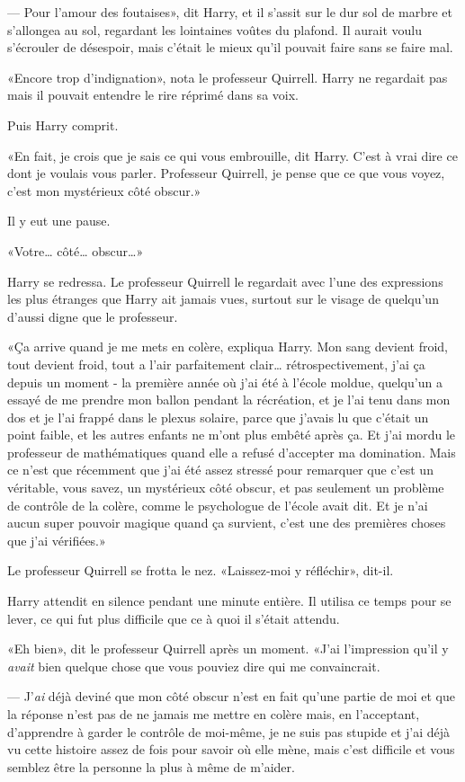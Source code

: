 --- Pour l'amour des foutaises», dit Harry, et il s'assit sur le dur sol de marbre et s'allongea au sol, regardant les lointaines voûtes du plafond. Il aurait voulu s'écrouler de désespoir, mais c'était le mieux qu'il pouvait faire sans se faire mal.

«Encore trop d'indignation», nota le professeur Quirrell. Harry ne regardait pas mais il pouvait entendre le rire réprimé dans sa voix.

Puis Harry comprit.

«En fait, je crois que je sais ce qui vous embrouille, dit Harry. C'est à vrai dire ce dont je voulais vous parler. Professeur Quirrell, je pense que ce que vous voyez, c'est mon mystérieux côté obscur.»

Il y eut une pause.

«Votre… côté… obscur…»

Harry se redressa. Le professeur Quirrell le regardait avec l'une des expressions les plus étranges que Harry ait jamais vues, surtout sur le visage de quelqu'un d'aussi digne que le professeur.

«Ça arrive quand je me mets en colère, expliqua Harry. Mon sang devient froid, tout devient froid, tout a l'air parfaitement clair… rétrospectivement, j'ai ça depuis un moment - la première année où j'ai été à l'école moldue, quelqu'un a essayé de me prendre mon ballon pendant la récréation, et je l'ai tenu dans mon dos et je l'ai frappé dans le plexus solaire, parce que j'avais lu que c'était un point faible, et les autres enfants ne m'ont plus embêté après ça. Et j'ai mordu le professeur de mathématiques quand elle a refusé d'accepter ma domination. Mais ce n'est que récemment que j'ai été assez stressé pour remarquer que c'est un véritable, vous savez, un mystérieux côté obscur, et pas seulement un problème de contrôle de la colère, comme le psychologue de l'école avait dit. Et je n'ai aucun super pouvoir magique quand ça survient, c'est une des premières choses que j'ai vérifiées.»

Le professeur Quirrell se frotta le nez. «Laissez-moi y réfléchir», dit-il.

Harry attendit en silence pendant une minute entière. Il utilisa ce temps pour se lever, ce qui fut plus difficile que ce à quoi il s'était attendu.

«Eh bien», dit le professeur Quirrell après un moment. «J'ai l'impression qu'il y \emph{avait} bien quelque chose que vous pouviez dire qui me convaincrait.

--- J'\emph{ai} déjà deviné que mon côté obscur n'est en fait qu'une partie de moi et que la réponse n'est pas de ne jamais me mettre en colère mais, en l'acceptant, d'apprendre à garder le contrôle de moi-même, je ne suis pas stupide et j'ai déjà vu cette histoire assez de fois pour savoir où elle mène, mais c'est difficile et vous semblez être la personne la plus à même de m'aider.

